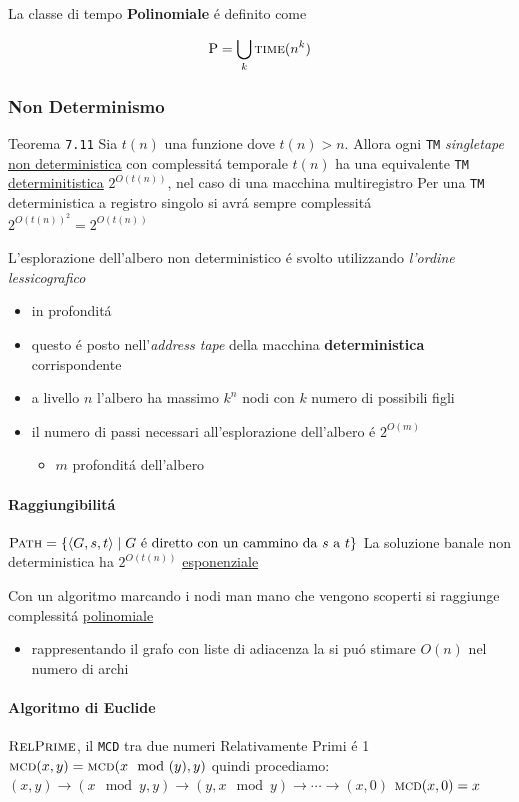 \documentclass[
                        12pt, %
                        a4paper, %
                        oneside, %
                        headinclude,footinclude, %
                        BCOR5mm, %
                  ]{scrartcl}
\begin{document}
La classe di tempo \textbf{Polinomiale} é definito come

\[\text{P} = \bigcup_k \textsc{time}(n^k)\]

\subsubsection{Non Determinismo}
\label{sec:org5992974}
Teorema \texttt{7.11}
Sia \(t(n)\) una funzione dove \(t(n)>n\).
Allora ogni \texttt{TM} \emph{singletape} \uline{non deterministica} con complessitá temporale \(t(n)\) ha una equivalente \texttt{TM} \uline{determinitistica} \(2^{O(t(n))}\), nel caso di una macchina multiregistro
Per una \texttt{TM} deterministica a registro singolo si avrá sempre complessitá \(2^{O(t(n))}^2 = 2^{O(t(n))}\)

L'esplorazione dell'albero non deterministico é svolto utilizzando \emph{l'ordine lessicografico}
\begin{itemize}
\item in profonditá
\item questo é posto nell'\emph{address tape} della macchina \textbf{deterministica} corrispondente
\item a livello \(n\) l'albero ha massimo \(k^{n}\) nodi con \(k\) numero di possibili figli
\item il numero di passi necessari all'esplorazione dell'albero é \(2^{O(m)}\)
\begin{itemize}
\item \(m\) profonditá dell'albero
\end{itemize}
\end{itemize}
\paragraph{Raggiungibilitá}
\label{sec:orgeaa4b1a}
\(\textsc{Path} = \{ \langle G,s,t  \rangle \mid G \text{ é  diretto con un cammino da }s \text{ a } t \}\)
La soluzione banale non deterministica ha \(2^{O(t(n))}\) \uline{esponenziale}

Con un algoritmo marcando i nodi man mano che vengono scoperti si raggiunge complessitá \uline{polinomiale}
\begin{itemize}
\item rappresentando il grafo con liste di adiacenza la si puó stimare \(O(n)\) nel numero di archi
\end{itemize}
\paragraph{Algoritmo di Euclide}
\label{sec:org7e9c442}
\(\textsc{RelPrime}\), il \texttt{MCD} tra due numeri Relativamente Primi é 1
\(\textsc{mcd}(x,y) = \textsc{mcd}(x \mod(y), y)\)
quindi procediamo:
\((x,y) \to (x \mod{y}, y) \to (y, x\mod{y})\to \cdots \to (x,0)\)
\(\textsc{mcd}(x,0) = x\)
\end{document}
